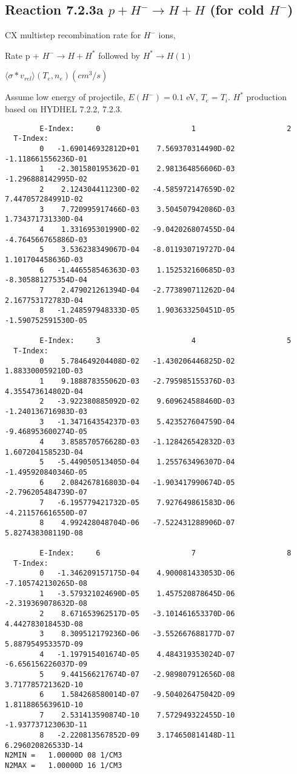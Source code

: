 \documentclass[12pt,dvipdfmx]{article}
\begin{document}
\subsection{
Reaction 7.2.3a   $ p + H^{-} \rightarrow  H + H$ (for cold $H^-$)
}
  CX multistep recombination rate for $H^-$ ions,
 \cite{kn:Sawada}

  Rate p + $H^- \rightarrow H + H^*$ followed by $H^* \rightarrow H(1)$

$  \langle \sigma*v_{rel} \rangle(T_e,n_e) (cm^3/s)$

Assume low energy of projectile, $E(H^-)=0.1$ eV, $T_e = T_i$.
$H^*$ production based on HYDHEL 7.2.2, 7.2.3.

\begin{small}\begin{verbatim}
        E-Index:     0                     1                     2
  T-Index:
        0   -1.690146932812D+01    7.569370314490D-02   -1.118661556236D-01
        1   -2.301580195362D-01    2.981364856606D-03   -1.296888142995D-02
        2    2.124304411230D-02   -4.585972147659D-02    7.447057284991D-02
        3    7.720995917466D-03    3.504507942086D-03    1.734371731330D-04
        4    1.331695301990D-02   -9.042026807455D-04   -4.764566765886D-03
        5    3.536238349067D-04   -8.011930719727D-04    1.101704458636D-03
        6   -1.446558546363D-03    1.152532160685D-03   -8.305881275354D-04
        7    2.479021261394D-04   -2.773890711262D-04    2.167753172783D-04
        8   -1.248597948333D-05    1.903633250451D-05   -1.590752591530D-05

        E-Index:     3                     4                     5
  T-Index:
        0    5.784649204408D-02   -1.430206446825D-02    1.883300059210D-03
        1    9.188878355062D-03   -2.795985155376D-03    4.355473614802D-04
        2   -3.922380885092D-02    9.609624588460D-03   -1.240136716983D-03
        3   -1.347164354237D-03    5.423527604759D-04   -9.468953600274D-05
        4    3.858570576628D-03   -1.128426542832D-03    1.607204158523D-04
        5   -5.449050513405D-04    1.255763496307D-04   -1.495920840346D-05
        6    2.084267816803D-04   -1.903417990674D-05   -2.796205484739D-07
        7   -6.195779421732D-05    7.927649861583D-06   -4.211576616550D-07
        8    4.992428048704D-06   -7.522431288906D-07    5.827438308119D-08

        E-Index:     6                     7                     8
  T-Index:
        0   -1.346209157175D-04    4.900081433053D-06   -7.105742130265D-08
        1   -3.579321024690D-05    1.457520878645D-06   -2.319369078632D-08
        2    8.671653962517D-05   -3.101461653370D-06    4.442783018453D-08
        3    8.309512179236D-06   -3.552667688177D-07    5.887954953357D-09
        4   -1.197915401674D-05    4.484319353024D-07   -6.656156226037D-09
        5    9.441566217674D-07   -2.989807912656D-08    3.717785721362D-10
        6    1.584268580014D-07   -9.504026475042D-09    1.811886563961D-10
        7    2.531413590874D-10    7.572949322455D-10   -1.937737123063D-11
        8   -2.220813567852D-09    3.174650814148D-11    6.296020826533D-14
N2MIN =   1.00000D 08 1/CM3
N2MAX =   1.00000D 16 1/CM3


\end{verbatim}
\end{small}
\end{document}
